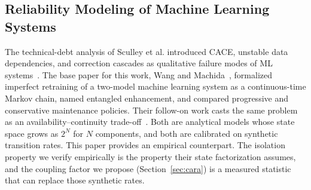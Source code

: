 \documentclass[conference]{IEEEtran}
\begin{document}
\subsection{Reliability Modeling of Machine Learning Systems}
The technical-debt analysis of Sculley et al. introduced CACE, unstable data
dependencies, and correction cascades as qualitative failure modes of ML
systems~\cite{sculley2015hidden}. The base paper for this work, Wang and
Machida~\cite{wang2024compsac}, formalized imperfect retraining of a
two-model machine learning system as a continuous-time Markov chain, named entangled
enhancement, and compared progressive and conservative maintenance policies.
Their follow-on work casts the same problem as an availability--continuity
trade-off~\cite{wang2025issre}. Both are analytical models whose state space
grows as $2^N$ for $N$ components, and both are calibrated on synthetic
transition rates. This paper provides an empirical counterpart. The isolation
property we verify empirically is the property their state factorization assumes, and
the coupling factor we propose (Section~\ref{sec:cara}) is a measured statistic
that can replace those synthetic rates.


\end{document}
